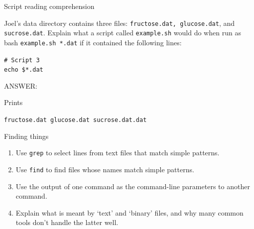 \documentclass{beamer}
\begin{document}

\begin{frame}{Script reading comprehension}

Joel's data directory contains three files: \texttt{fructose.dat, glucose.dat}, and \texttt{sucrose.dat}. Explain what a script called \texttt{example.sh} would do when run as bash \texttt{example.sh *.dat} if it contained the following lines:
\vspace{0.5cm}

\begin{beamerboxesrounded}[upper=uppercolgreen,lower=lowercolgreen,shadow=false]{}
\small{\texttt{\# Script 3\\
echo \$*.dat}}
\end{beamerboxesrounded}

\alert{ANSWER:}

Prints

\texttt{fructose.dat glucose.dat sucrose.dat.dat}

\end{frame}



\begin{frame}{Finding things}

\begin{enumerate}
    \item{Use \texttt{grep} to select lines from text files that match simple patterns.}
    \item{Use \texttt{find} to find files whose names match simple patterns.}
    \item{Use the output of one command as the command-line parameters to another command.}
    \item{Explain what is meant by `text' and `binary' files, and why many common tools don't handle the latter well.}
\end{enumerate}


\end{frame}

\end{document}
